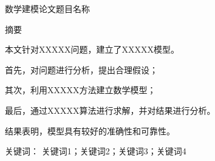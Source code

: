 


\begin{center}

{\heiti{}
数学建模论文题目名称
}

\end{center}


\vspace{1em}


\begin{center}

{\heiti{}
摘\quad 要
}

\end{center}

\songti


本文针对XXXXX问题，建立了XXXXX模型。

首先，对问题进行分析，提出合理假设；

其次，利用XXXXX方法建立数学模型；

最后，通过XXXXX算法进行求解，并对结果进行分析。

结果表明，模型具有较好的准确性和可靠性。



\vspace{1em}


\noindent
{\heiti{}
关键词：
}
{\songti{}
关键词1；关键词2；关键词3；关键词4
}
\newpage